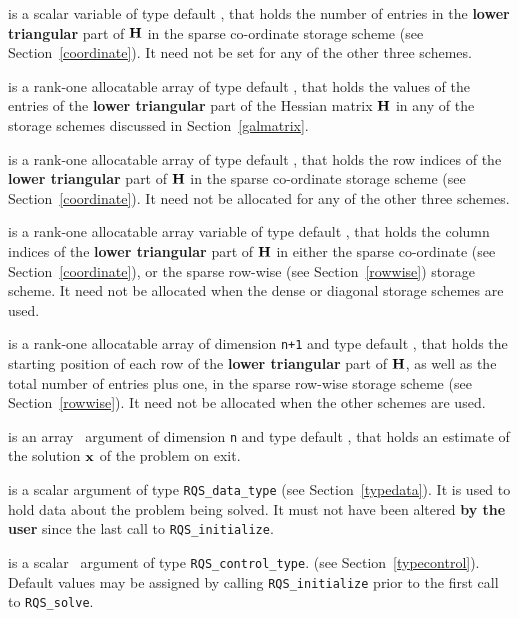 \documentclass{galahad}
\newcommand{\packagename}{RQS}
\begin{document}
\begin{description}
\begin{description}
 is a scalar variable of type default \integer, that
holds the number of entries in the {\bf lower triangular} part of ${\mathbf{H}}$
in the sparse co-ordinate storage scheme (see Section~\ref{coordinate}).
It need not be set for any of the other three schemes.

 is a rank-one allocatable array of type default \realdp, that holds
the values of the entries of the {\bf lower triangular} part
of the Hessian matrix ${\mathbf{H}}$ in any of the
storage schemes discussed in Section~\ref{galmatrix}.

 is a rank-one allocatable array of type default \integer,
that holds the row indices of the {\bf lower triangular} part of ${\mathbf{H}}$
in the sparse co-ordinate storage
scheme (see Section~\ref{coordinate}).
It need not be allocated for any of the other three schemes.

 is a rank-one allocatable array variable of type default \integer,
that holds the column indices of the {\bf lower triangular} part of
${\mathbf{H}}$ in either the sparse co-ordinate
(see Section~\ref{coordinate}), or the sparse row-wise
(see Section~\ref{rowwise}) storage scheme.
It need not be allocated when the dense or diagonal storage schemes are used.

 is a rank-one allocatable array of dimension {\tt n+1} and type
default \integer, that holds the starting position of
each row of the {\bf lower triangular} part of ${\mathbf{H}}$, as well
as the total number of entries plus one, in the sparse row-wise storage
scheme (see Section~\ref{rowwise}). It need not be allocated when the
other schemes are used.

\end{description}

 is an array \intentout\ argument of dimension {\tt n} and
type default \realdp, that holds an estimate of the solution ${\mathbf{x}}$
of the problem on exit.

 is a scalar \intentinout argument of type
{\tt \packagename\_data\_type}
(see Section~\ref{typedata}). It is used to hold data about the problem being
solved. It must not have been altered {\bf by the user} since the last call to
{\tt \packagename\_initialize}.

 is a scalar \intentin\ argument of type
{\tt \packagename\_control\_type}.
(see Section~\ref{typecontrol}).
Default values may be assigned by calling {\tt \packagename\_initialize}
prior to the first call to {\tt \packagename\_solve}.


\end{description}
\end{document}
